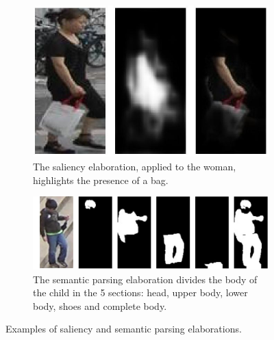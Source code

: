 \begin{figure}[!h]
	\centering
	\begin{subfigure}{0.33\textwidth}
		\includegraphics[width=\linewidth]{images/recognition/ssp_saliency}
		\caption{The saliency elaboration, applied to the woman, highlights the presence of a bag.}
		\label{fig:sub_saliency}
	\end{subfigure}
	\begin{subfigure}{0.66\textwidth}
		\includegraphics[width=\linewidth]{images/recognition/ssp_semanticParsing}
		\captionsetup{margin=0.5cm}
		\caption{The semantic parsing elaboration divides the body of the child in the 5 sections: head, upper body, lower body, shoes and complete body.}
		\label{fig:sub_semanticParsing}
	\end{subfigure}
	\captionsetup{margin=0.5cm}
	\caption{Examples of saliency and semantic parsing elaborations.}
	\label{fig:howItWorks_sspReID}
\end{figure}


